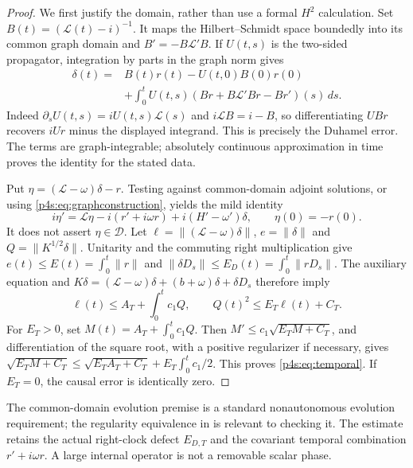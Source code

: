 \documentclass[11pt]{article}
\numberwithin{equation}{section}
\theoremstyle{definition}
\theoremstyle{remark}
\begin{document}
\begin{proof}
We first justify the domain, rather than use a formal $H^2$ calculation.
Set $B(t)=(\mathcal L(t)-i)^{-1}$. It maps the Hilbert--Schmidt space
boundedly into its common graph domain and
$B'=-B\mathcal L'B$. If $U(t,s)$ is the two-sided propagator, integration
by parts in the graph norm gives
\begin{align}
 \delta(t)={}&B(t)r(t)-U(t,0)B(0)r(0)\nonumber\\
 &+\int_0^tU(t,s)
       \left(Br+B\mathcal L'Br-Br'\right)(s)\,ds .
       \label{p4s:eq:graphconstruction}
\end{align}
Indeed $\partial_sU(t,s)=iU(t,s)\mathcal L(s)$ and
$i\mathcal L B=i-B$, so differentiating $UBr$ recovers
$iU r$ minus the displayed integrand. This is precisely the
Duhamel error. The terms are graph-integrable; absolutely continuous
approximation in time proves the identity for the stated data.

Put $\eta=(\mathcal L-\omega)\delta-r$. Testing against
common-domain adjoint solutions, or using
\eqref{p4s:eq:graphconstruction}, yields the mild identity
\[
 i\eta'=\mathcal L\eta-i(r'+i\omega r)
                           +i(H'-\omega')\delta,\qquad\eta(0)=-r(0).
\]
It does not assert $\eta\in\mathcal D$. Let
$\ell=\|(\mathcal L-\omega)\delta\|$, $e=\|\delta\|$ and
$Q=\|K^{1/2}\delta\|$. Unitarity and the commuting right multiplication
give
$e(t)\leq E(t)=\int_0^t\|r\|$ and
$\|\delta D_s\|\leq E_D(t)=\int_0^t\|rD_s\|$.
The auxiliary equation and
$K\delta=(\mathcal L-\omega)\delta+(b+\omega)\delta+\delta D_s$
therefore imply
\[
 \ell(t)\leq A_T+\int_0^tc_1Q,\qquad
 Q(t)^2\leq E_T\ell(t)+C_T .
\]
For $E_T>0$, set $M(t)=A_T+\int_0^tc_1Q$. Then
$M'\leq c_1\sqrt{E_TM+C_T}$, and differentiation of the square root,
with a positive regularizer if necessary, gives
$\sqrt{E_TM+C_T}\leq\sqrt{E_TA_T+C_T}+E_T\int_0^tc_1/2$.
This proves \eqref{p4s:eq:temporal}. If $E_T=0$, the causal error is
identically zero.
\end{proof}

The common-domain evolution premise is a standard nonautonomous
evolution requirement; the regularity equivalence in
\cite{SchmidGriesemer2014} is relevant to checking it. The estimate
retains the actual right-clock defect $E_{D,T}$ and the covariant
temporal combination $r'+i\omega r$. A large internal operator is
not a removable scalar phase.
\end{document}
